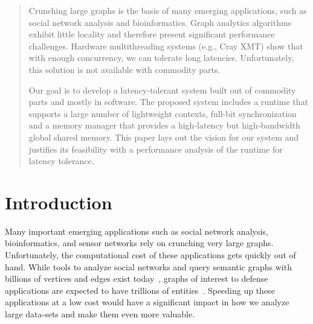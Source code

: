 \documentclass[10pt,nocopyrightspace]{sigplanconf}
\begin{document}
\thispagestyle{empty}
\pagestyle{empty}


\begin{abstract}
   Crunching large graphs is the basis of many emerging applications,
   such as social network analysis and bioinformatics. Graph analytics
   algorithms exhibit little locality and therefore present significant
   performance challenges. Hardware multithreading systems (e.g., Cray
   {\small XMT}) show that with enough concurrency, we can tolerate long
   latencies. Unfortunately, this solution is not available with
   commodity parts.
 
   Our goal is to develop a latency-tolerant system built out of
   commodity parts and mostly in software. The proposed system includes
   a runtime that supports a large number of lightweight contexts,
   full-bit synchronization and a memory manager that provides a
   high-latency but high-bandwidth global shared memory. This paper
   lays out the vision for our system and justifies its feasibility
   with a performance analysis of the runtime for latency tolerance.
 
\end{abstract}

\renewcommand{\baselinestretch}{0.8}

\section{Introduction}

Many important emerging applications such as social network analysis,
bioinformatics, and sensor networks rely on crunching very large
graphs. Unfortunately, the computational cost of these applications
gets quickly out of hand. While tools to analyze social networks and
query semantic graphs with billions of vertices and edges exist
today~\cite{joslyn:hpsf, ediger:msda, brocheler:cosi, pegasus,
  pregel}, graphs of interest to defense applications are expected to
have trillions of entities~\cite{hartley:mssg, kolda:imkd}. Speeding
up these applications at a low cost would have a significant impact in how
we analyze large data-sets and make them even more valuable.



\end{document}

